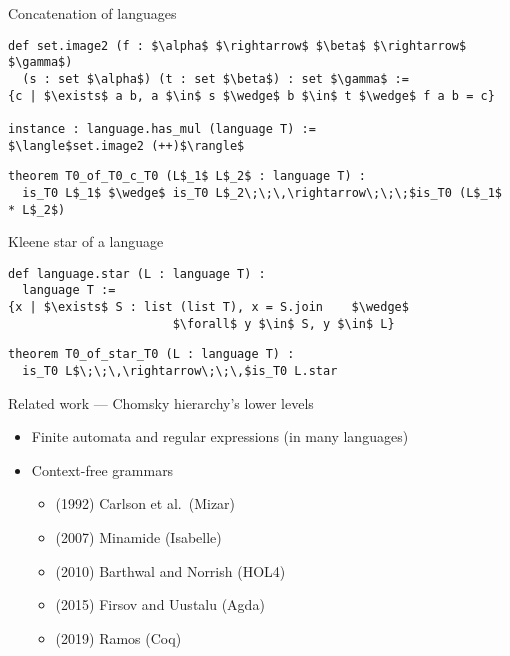 \documentclass{beamer}
\begin{document}
	\begin{frame}[fragile]{Concatenation of languages}
\begin{lstlisting}
def set.image2 (f : $\alpha$ $\rightarrow$ $\beta$ $\rightarrow$ $\gamma$)
  (s : set $\alpha$) (t : set $\beta$) : set $\gamma$ :=
{c | $\exists$ a b, a $\in$ s $\wedge$ b $\in$ t $\wedge$ f a b = c}

instance : language.has_mul (language T) :=
$\langle$set.image2 (++)$\rangle$
\end{lstlisting}
\pause
\begin{lstlisting}
theorem T0_of_T0_c_T0 (L$_1$ L$_2$ : language T) :
  is_T0 L$_1$ $\wedge$ is_T0 L$_2\;\;\,\rightarrow\;\;\;$is_T0 (L$_1$ * L$_2$)
\end{lstlisting}
	\end{frame}
	
	\begin{frame}[fragile]{Kleene star of a language}
\begin{lstlisting}
def language.star (L : language T) :
  language T :=
{x | $\exists$ S : list (list T), x = S.join    $\wedge$
                       $\forall$ y $\in$ S, y $\in$ L}
\end{lstlisting}
\pause
\begin{lstlisting}
theorem T0_of_star_T0 (L : language T) :
  is_T0 L$\;\;\,\rightarrow\;\;\,$is_T0 L.star
\end{lstlisting}
	\end{frame}
	
	\begin{frame}{Related work --- Chomsky hierarchy's lower levels}
		\begin{itemize}
			\item Finite automata and regular expressions (in many languages)
			\item Context-free grammars
			\begin{itemize}
				\item (1992) Carlson et al.\ (Mizar)
				\item (2007) Minamide (Isabelle)
				\item (2010) Barthwal and Norrish (HOL4)
				\item (2015) Firsov and Uustalu (Agda)
				\item (2019) Ramos (Coq)
			\end{itemize}
		\end{itemize}
	\end{frame}
	
\end{document}
